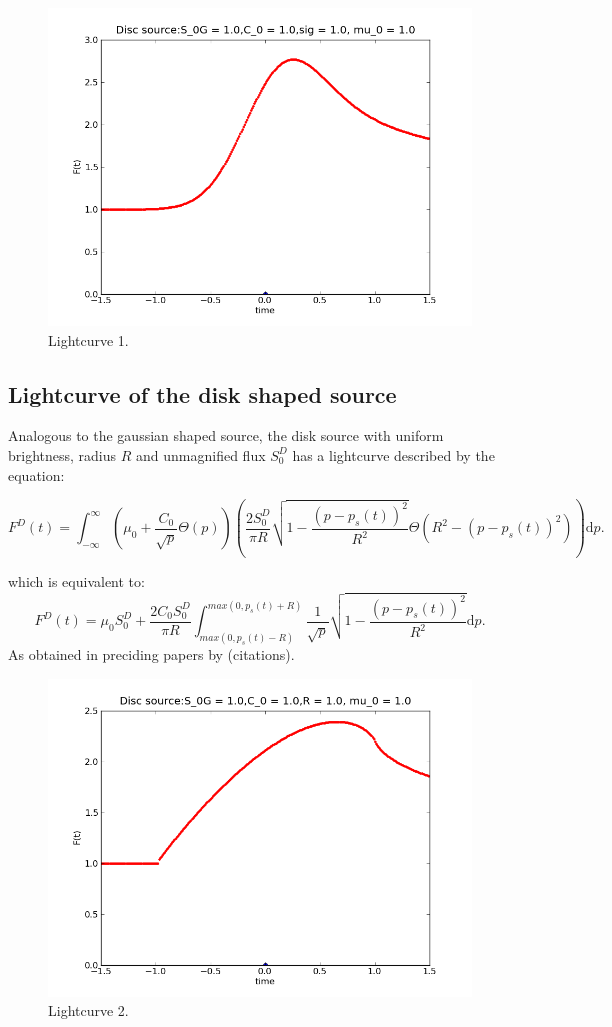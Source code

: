 \begin{figure}
\includegraphics[width = .8\textwidth]{lightcurve_gaussian_1.png}
\caption{Lightcurve 1.}
\end{figure}


\subsection{Lightcurve of the disk shaped source}

Analogous to the gaussian shaped source, the disk source with uniform brightness, radius $R$ and unmagnified flux $S_0^D$ has a lightcurve described by the equation:

\begin{equation}
 F^D(t) = \int_{-\infty}^\infty  \left( \mu_0 + \frac{C_0}{\sqrt{p}} \Theta \left( p \right) \right) \left( \frac{2 S_0^D}{ \pi R} \sqrt{1 - \frac{\left( p-p_s(t) \right)^2}{R^2}} \Theta \left(R^2 - \left(p-p_s(t) \right)^2 \right) \right) \mathrm{d}p.
\end{equation}

which is equivalent to:
\begin{equation}
 F^D(t) = \mu_0 S_0^D + \frac{2 C_0 S_0^D}{\pi R} \int_{max(0, p_s(t) - R)}^{max(0, p_s(t) + R)} \frac{1}{\sqrt{p}} \sqrt{1 - \frac{\left( p-p_s(t) \right)^2}{R^2}} \mathrm{d}p.
\end{equation}
As obtained in preciding papers by (citations).\\

\begin{figure}
\includegraphics[width = .8\textwidth]{lightcurve_disc_1.png}
\caption{Lightcurve 2.}
\end{figure}


